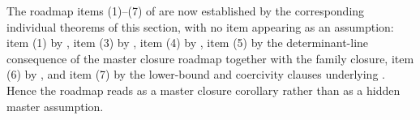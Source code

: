 \begin{corollary}
\label{cor:master-closure-corollary}
The roadmap items (1)--(7) of  are now established by
the corresponding individual theorems of this section, with no item appearing as an assumption:
item (1) by , item (3) by , item (4) by
, item (5) by the determinant-line consequence of the
master closure roadmap together with the family closure, item (6) by
, and item (7) by the lower-bound and coercivity
clauses underlying . Hence the roadmap reads as a
master closure corollary rather than as a hidden master assumption.
\end{corollary}

